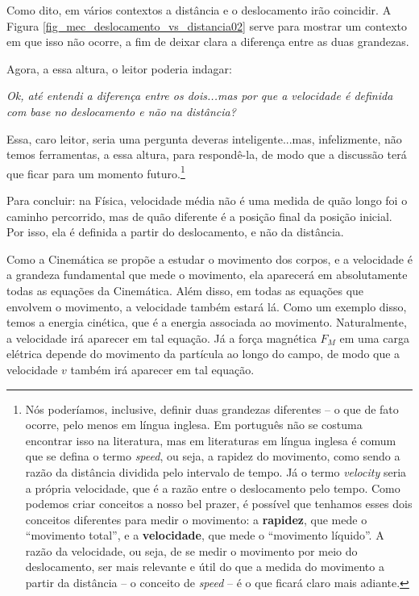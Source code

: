Como dito, em vários contextos a distância e o deslocamento irão coincidir. A Figura \ref{fig_mec_deslocamento_vs_distancia02} serve para mostrar um contexto em que isso não ocorre, a fim de deixar clara a diferença entre as duas grandezas.

Agora, a essa altura, o leitor poderia indagar:

\begin{center}
\textit{Ok, até entendi a diferença entre os dois...mas por que a velocidade é definida com base no deslocamento e não na distância?}
\end{center}

Essa, caro leitor, seria uma pergunta deveras inteligente...mas, infelizmente, não temos ferramentas, a essa altura, para respondê-la, de modo que a discussão terá que ficar para um momento futuro.\footnote{Nós poderíamos, inclusive, definir duas grandezas diferentes -- o que de fato ocorre, pelo menos em língua inglesa. Em português não se costuma encontrar isso na literatura, mas em literaturas em língua inglesa é comum que se defina o termo \textit{speed}, ou seja, a rapidez do movimento, como sendo a razão da distância dividida pelo intervalo de tempo. Já o termo \textit{velocity} seria a própria velocidade, que é a razão entre o deslocamento pelo tempo. Como podemos criar conceitos a nosso bel prazer, é possível que tenhamos esses dois conceitos diferentes para medir o movimento: a \textbf{rapidez}, que mede o ``movimento total'', e a \textbf{velocidade}, que mede o ``movimento líquido''. A razão da velocidade, ou seja, de se medir o movimento por meio do deslocamento, ser mais relevante e útil do que a medida do movimento a partir da distância -- o conceito de \textit{speed} -- é o que ficará claro mais adiante.}


Para concluir: na Física, velocidade média não é uma medida de quão longo foi o caminho percorrido, mas de quão diferente é a posição final da posição inicial. Por isso, ela é definida a partir do deslocamento, e não da distância.



Como a Cinemática se propõe a estudar o movimento dos corpos, e a velocidade é a grandeza fundamental que mede o movimento, ela aparecerá em absolutamente todas as equações da Cinemática. Além disso, em todas as equações que envolvem o movimento, a velocidade também estará lá. Como um exemplo disso, temos a energia cinética, que é a energia associada ao movimento. Naturalmente, a velocidade irá aparecer em tal equação. Já a força magnética $F_M$ em uma carga elétrica depende do movimento da partícula ao longo do campo, de modo que a velocidade $v$ também irá aparecer em tal equação.


